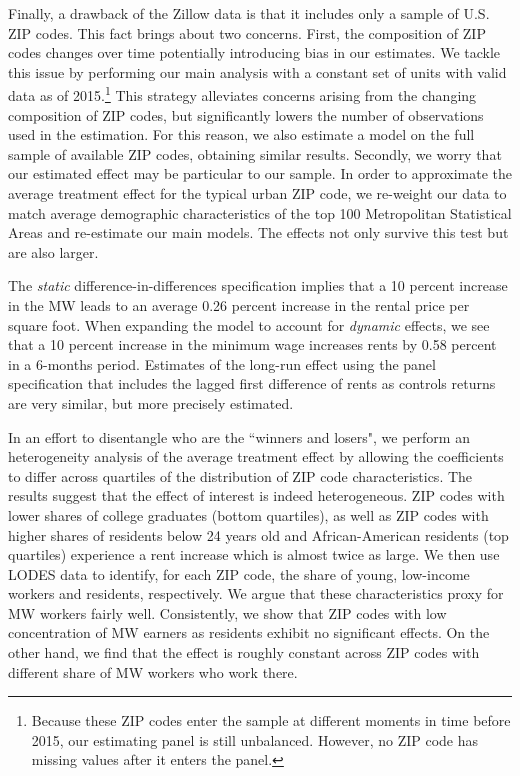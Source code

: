 Finally, a drawback of the Zillow data is that it includes only a sample of U.S. ZIP codes. 
This fact brings about two concerns.
First, the composition of ZIP codes changes over time potentially introducing bias in our 
estimates. We tackle this issue by performing our main analysis with a constant set of 
units with valid data as of 2015.\footnote{Because these ZIP codes enter the sample at 
	different moments in time before 2015, our estimating panel is still unbalanced. 
	However, no ZIP code has missing values after it enters the panel.}
This strategy alleviates concerns arising from the changing composition of ZIP codes, but 
significantly lowers the number of observations used in the estimation. For this reason, 
we also estimate a model on the full sample of available ZIP codes, obtaining similar 
results.
Secondly, we worry that our estimated effect may be particular to our sample. In order 
to approximate the average treatment effect for the typical urban ZIP code, we re-weight 
our data to match average demographic characteristics of the top 100 Metropolitan 
Statistical Areas and re-estimate our main models. The effects not only survive this test 
but are also larger.


The \textit{static} difference-in-differences specification implies that a 10 percent 
increase in the MW leads to an average 0.26 percent increase in the rental price per 
square foot.
When expanding the model to account for \textit{dynamic} effects, we see that a 10 
percent increase in the minimum wage increases rents by 0.58 percent in a 6-months period.
Estimates of the long-run effect using the panel specification that includes the lagged 
first difference of rents as controls returns are very similar, but more precisely 
estimated.

In an effort to disentangle who are the ``winners and losers", we perform an 
heterogeneity analysis of the average treatment effect by allowing the coefficients to 
differ across quartiles of the distribution of ZIP code characteristics.
The results suggest that the effect of interest is indeed heterogeneous.
ZIP codes with lower shares of college graduates (bottom quartiles), as well as 
ZIP codes with higher shares of residents below 24 years old and African-American 
residents (top quartiles) experience a rent increase which is almost twice as large.
We then use LODES data to identify, for each ZIP code, the share of young, low-income 
workers and residents, respectively.
We argue that these characteristics proxy for MW workers fairly well.
Consistently, we show that ZIP codes with low concentration of MW earners as residents 
exhibit no significant effects.
On the other hand, we find that the effect is roughly constant across ZIP codes with 
different share of MW workers who work there.

